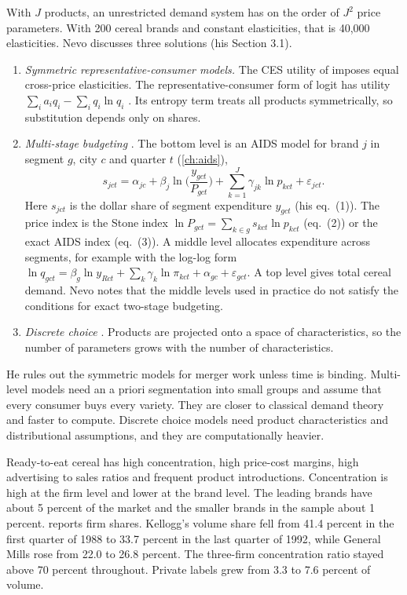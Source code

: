  With $J$ products, an unrestricted demand system has on the order of $J^2$ price
parameters. With 200 cereal brands and constant elasticities, that is 40,000 elasticities. Nevo discusses three
solutions (his Section 3.1).
\begin{enumerate}[label=(\alph*)]
  \item \emph{Symmetric representative-consumer models.} The CES utility of \citet{DixitStiglitz1977} imposes equal
        cross-price elasticities. The representative-consumer form of logit has utility
        $\sum_i a_i q_i - \sum_i q_i \ln q_i$ \citep{AndersonDePalmaThisse1992}. Its entropy term treats all products
        symmetrically, so substitution depends only on shares.
  \item \emph{Multi-stage budgeting} \citep{HausmanLeonardZona1994}. The bottom level is an AIDS model for brand $j$ in
        segment $g$, city $c$ and quarter $t$ (\cref{ch:aids}),
        \begin{equation}\label{eq:11-nevo-aids}
          s_{jct} = \alpha_{jc} + \beta_j \ln\Big(\frac{y_{gct}}{P_{gct}}\Big) + \sum_{k=1}^{J} \gamma_{jk}\ln p_{kct} + \varepsilon_{jct} .
        \end{equation}
        Here $s_{jct}$ is the dollar share of segment expenditure $y_{gct}$ (his eq.~(1)). The price index is the Stone
        index $\ln P_{gct} = \sum_{k \in g} s_{kct}\ln p_{kct}$ (eq.~(2)) or the exact AIDS index (eq.~(3)). A middle
        level allocates expenditure across segments, for example with the log-log form
        $\ln q_{gct} = \beta_g \ln y_{Rct} + \sum_{k} \gamma_k \ln \pi_{kct} + \alpha_{gc} + \varepsilon_{gct}$. A top
        level gives total cereal demand. Nevo notes that the middle levels used in practice do not satisfy the
        conditions for exact two-stage budgeting.
  \item \emph{Discrete choice} \citep{Berry1994,BerryLevinsohnPakes1995}. Products are projected onto a space of
        characteristics, so the number of parameters grows with the number of characteristics.
\end{enumerate}
He rules out the symmetric models for merger work unless time is binding. Multi-level models need an a priori
segmentation into small groups and assume that every consumer buys every variety. They are closer to classical demand
theory and faster to compute. Discrete choice models need product characteristics and distributional assumptions, and
they are computationally heavier.

 Ready-to-eat cereal has high concentration, high price-cost margins, high advertising to
sales ratios and frequent product introductions. Concentration is high at the firm level and lower at the brand level.
The leading brands have about 5 percent of the market and the smaller brands in the sample about 1 percent.
 reports firm shares. Kellogg's volume share fell from 41.4 percent in the first quarter of
1988 to 33.7 percent in the last quarter of 1992, while General Mills rose from 22.0 to 26.8 percent. The three-firm
concentration ratio stayed above 70 percent throughout. Private labels grew from 3.3 to 7.6 percent of volume.

